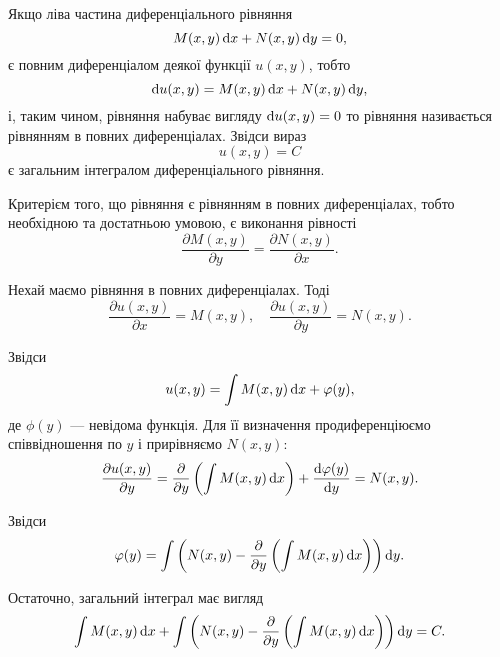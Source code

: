 Якщо ліва частина диференціального рівняння
\begin{equation*}
	M(x, y) \mathop{}\!\mathrm{d} x + N(x, y) \mathop{}\!\mathrm{d} y = 0,
\end{equation*}
є повним диференціалом деякої функції $u(x, y)$, тобто
\begin{equation*}
	\mathop{}\!\mathrm{d} u(x, y) = M(x, y) \mathop{}\!\mathrm{d} x + N(x, y) \mathop{}\!\mathrm{d} y,
\end{equation*}
і, таким чином, рівняння набуває вигляду $\mathop{}\!\mathrm{d} u (x, y) = 0$ то рівняння називається рівнянням в повних диференціалах. Звідси вираз
\begin{equation*}
	u(x, y) = C
\end{equation*}
є загальним інтегралом диференціального рівняння. \parvskip

Критерієм того, що рівняння є рівнянням в повних диференціалах, тобто необхідною та достатньою умовою, є виконання рівності
\begin{equation*}
	\frac{\partial M(x, y)}{\partial y} = \frac{\partial N(x, y)}{\partial x}.
\end{equation*}
 
Нехай маємо рівняння в повних диференціалах. Тоді
\begin{equation*}
	\frac{\partial u(x, y)}{\partial x} = M(x, y), \quad \frac{\partial u(x, y)}{\partial y} = N(x, y).
\end{equation*}

Звідси 
\begin{equation*}
    u(x, y) = \int M(x, y) \mathop{}\!\mathrm{d} x + \varphi(y),
\end{equation*}
де $\phi(y)$ --- невідома функція. Для її визначення продиференціюємо співвідношення по $y$ і прирівняємо $N(x, y)$:
\begin{equation*}
	\frac{\partial u(x, y)}{\partial y} = \frac{\partial}{\partial y} \left( \int M(x, y) \mathop{}\!\mathrm{d} x \right) + \frac{\mathop{}\!\mathrm{d} \varphi(y)}{\mathop{}\!\mathrm{d} y} = N(x, y).
\end{equation*}

Звідси
\begin{equation*}
	\varphi(y) = \int \left( N(x, y) - \frac{\partial}{\partial y} \left( \int M(x, y) \mathop{}\!\mathrm{d} x \right) \right) \mathop{}\!\mathrm{d} y.
\end{equation*}

Остаточно, загальний інтеграл має вигляд
\begin{equation*}
	\int M(x, y) \mathop{}\!\mathrm{d} x + \int \left( N(x, y) - \frac{\partial}{\partial y} \left( \int M(x, y) \mathop{}\!\mathrm{d} x \right) \right) \mathop{}\!\mathrm{d} y = C.
\end{equation*}

